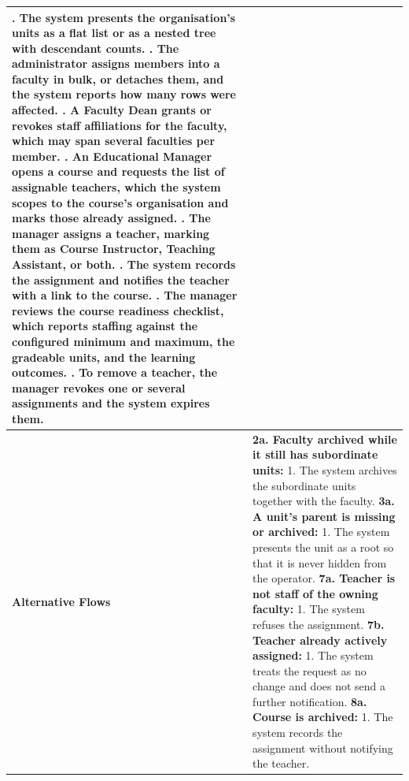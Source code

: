 \begin{longtable}{|>{\raggedright\arraybackslash}p{}|>{\raggedright\arraybackslash}p{}|}
3. The system presents the organisation's units as a flat list or as a nested tree with descendant counts. \newline
4. The administrator assigns members into a faculty in bulk, or detaches them, and the system reports how many rows were affected. \newline
5. A Faculty Dean grants or revokes staff affiliations for the faculty, which may span several faculties per member. \newline
6. An Educational Manager opens a course and requests the list of assignable teachers, which the system scopes to the course's organisation and marks those already assigned. \newline
7. The manager assigns a teacher, marking them as Course Instructor, Teaching Assistant, or both. \newline
8. The system records the assignment and notifies the teacher with a link to the course. \newline
9. The manager reviews the course readiness checklist, which reports staffing against the configured minimum and maximum, the gradeable units, and the learning outcomes. \newline
10. To remove a teacher, the manager revokes one or several assignments and the system expires them. \\ \hline
\textbf{Alternative Flows} &
\textbf{2a. Faculty archived while it still has subordinate units:} \newline
\hspace*{1em}1. The system archives the subordinate units together with the faculty. \newline
\textbf{3a. A unit's parent is missing or archived:} \newline
\hspace*{1em}1. The system presents the unit as a root so that it is never hidden from the operator. \newline
\textbf{7a. Teacher is not staff of the owning faculty:} \newline
\hspace*{1em}1. The system refuses the assignment. \newline
\textbf{7b. Teacher already actively assigned:} \newline
\hspace*{1em}1. The system treats the request as no change and does not send a further notification. \newline
\textbf{8a. Course is archived:} \newline
\hspace*{1em}1. The system records the assignment without notifying the teacher. \\
\end{longtable}

